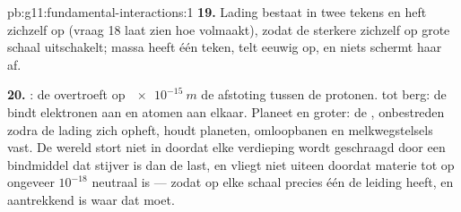 \begin{solution}{pb:g11:fundamental-interactions:1}
\textbf{19.} Lading bestaat in twee tekens en heft zichzelf op (vraag 18
laat zien hoe volmaakt), zodat de sterkere  zichzelf op grote
schaal uitschakelt; massa heeft één teken, telt eeuwig op, en niets
schermt haar af.

\textbf{20.} : de  overtroeft op $\qty{e-15}{m}$
de afstoting tussen de protonen.  tot berg: de  bindt elektronen aan  en atomen aan elkaar. Planeet
en groter: de , onbestreden zodra de lading zich opheft, houdt
planeten, omloopbanen en melkwegstelsels vast. De wereld stort niet in
doordat elke verdieping wordt geschraagd door een bindmiddel dat stijver
is dan de last, en vliegt niet uiteen doordat materie tot op ongeveer
$10^{-18}$ neutraal is --- zodat op elke schaal precies één  de
leiding heeft, en aantrekkend is waar dat moet.
\end{solution}
